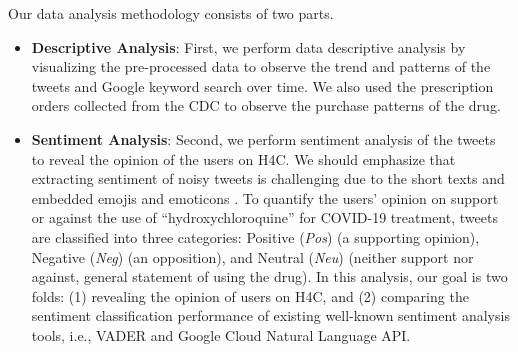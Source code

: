 \documentclass[conference]{IEEEtran}
\begin{document}
	Our data analysis methodology consists of two parts. 
	\begin{itemize}
		\item {\bf Descriptive Analysis}: First, we perform data descriptive analysis by visualizing the pre-processed data to observe the trend and patterns of the tweets and Google keyword search over time. We also used the prescription orders collected from the CDC to observe the purchase patterns of the drug.	
		\item {\bf Sentiment Analysis}: Second, we perform sentiment analysis of the tweets to reveal the opinion of the users on H4C. We should emphasize that extracting sentiment of noisy tweets is challenging due to the short texts and embedded emojis and emoticons \cite{b19}. 
		To quantify the users' opinion on support or against the use of ``hydroxychloroquine'' for COVID-19 treatment, tweets are classified into three categories: Positive (\textit{Pos}) (a supporting opinion), Negative (\textit{Neg}) (an opposition), and Neutral (\textit{Neu}) (neither support nor against, general statement of using the drug). In this analysis, our goal is two folds: (1) revealing the opinion of users on H4C, and (2) comparing the sentiment classification performance of existing well-known sentiment analysis tools, i.e., VADER and Google Cloud Natural Language API. 
		

\end{itemize}
\end{document}

